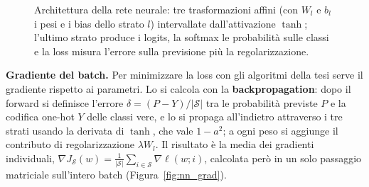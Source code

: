 \documentclass[italian, a4paper, twoside, binding=6mm]{sapthesis}
\begin{document}
\begin{figure}[H]
\centering
{}
\caption{Architettura della rete neurale: tre trasformazioni affini (con
$W_l$ e $b_l$ i pesi e i bias dello strato $l$) intervallate dall'attivazione
$\tanh$; l'ultimo strato produce i logits, la softmax le probabilità sulle
classi e la loss misura l'errore sulla previsione più la regolarizzazione.}
\label{fig:nn_arch}
\end{figure}

\textbf{Gradiente del batch.} Per minimizzare la loss con gli algoritmi della
tesi serve il gradiente rispetto ai parametri. Lo si calcola con la
\textbf{backpropagation}: dopo il forward si definisce l'errore
$\delta = (P - Y)/|\mathcal{S}|$ tra le probabilità previste $P$ e la codifica
one-hot $Y$ delle classi vere, e lo si propaga all'indietro attraverso i tre
strati usando la derivata di $\tanh$, che vale $1 - a^2$; a ogni peso si
aggiunge il contributo di regolarizzazione $\lambda W_l$. Il risultato è la
media dei gradienti individuali,
$\nabla J_\mathcal{S}(w) = \frac{1}{|\mathcal{S}|}\sum_{i\in\mathcal{S}}\nabla\ell(w;i)$,
calcolata però in un solo passaggio matriciale sull'intero batch
(Figura~\ref{fig:nn_grad}).
\end{document}
